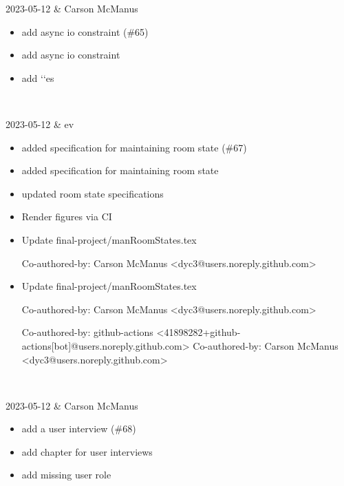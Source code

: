 2023-05-12 & Carson McManus
\begin{itemize}[topsep=0pt,itemsep=0pt,parsep=0pt,partopsep=0pt,leftmargin=12pt]
\item add async io constraint (\#65)

\item add async io constraint

\item add `\index`es
\end{itemize}
\\ \hline

2023-05-12 & ev
\begin{itemize}[topsep=0pt,itemsep=0pt,parsep=0pt,partopsep=0pt,leftmargin=12pt]
\item added specification for maintaining room state (\#67)

\item added specification for maintaining room state

\item updated room state specifications

\item Render figures via CI

\item Update final-project/manRoomStates.tex

Co-authored-by: Carson McManus <dyc3@users.noreply.github.com>

\item Update final-project/manRoomStates.tex

Co-authored-by: Carson McManus <dyc3@users.noreply.github.com>



Co-authored-by: github-actions <41898282+github-actions[bot]@users.noreply.github.com>
Co-authored-by: Carson McManus <dyc3@users.noreply.github.com>
\end{itemize}
\\ \hline

2023-05-12 & Carson McManus
\begin{itemize}[topsep=0pt,itemsep=0pt,parsep=0pt,partopsep=0pt,leftmargin=12pt]
\item add a user interview (\#68)

\item add chapter for user interviews

\item add missing user role
\end{itemize}
\\ \hline

